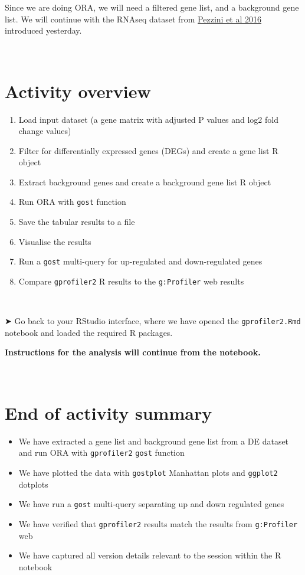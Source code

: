\documentclass[
]{book}
\providecommand{\tightlist}{%
  \setlength{\itemsep}{0pt}\setlength{\parskip}{0pt}}
\begin{document}
Since we are doing ORA, we will need a filtered gene list, and a background gene list. We will continue with the RNAseq dataset from \href{https://link.springer.com/article/10.1007/s10571-016-0403-y}{Pezzini et al 2016} introduced yesterday.

~

\hypertarget{activity-overview}{%
\section{Activity overview}\label{activity-overview}}

\begin{enumerate}
\def\labelenumi{\arabic{enumi}.}
\tightlist
\item
  Load input dataset (a gene matrix with adjusted P values and log2 fold change values)
\item
  Filter for differentially expressed genes (DEGs) and create a gene list R object
\item
  Extract background genes and create a background gene list R object
\item
  Run ORA with \texttt{gost} function
\item
  Save the tabular results to a file
\item
  Visualise the results
\item
  Run a \texttt{gost} multi-query for up-regulated and down-regulated genes
\item
  Compare \texttt{gprofiler2} R results to the \texttt{g:Profiler} web results
\end{enumerate}

~

➤ Go back to your RStudio interface, where we have opened the \texttt{gprofiler2.Rmd} notebook and loaded the required R packages.

\textbf{Instructions for the analysis will continue from the notebook.}

~

\hypertarget{end-of-activity-summary}{%
\section{End of activity summary}\label{end-of-activity-summary}}

\begin{itemize}
\tightlist
\item
  We have extracted a gene list and background gene list from a DE dataset and run ORA with \texttt{gprofiler2} \texttt{gost} function
\item
  We have plotted the data with \texttt{gostplot} Manhattan plots and \texttt{ggplot2} dotplots
\item
  We have run a \texttt{gost} multi-query separating up and down regulated genes
\item
  We have verified that \texttt{gprofiler2} results match the results from \texttt{g:Profiler} web
\item
  We have captured all version details relevant to the session within the R notebook
\end{itemize}
\end{document}
